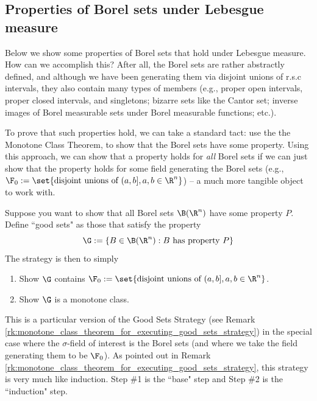 \documentclass{article} %
\begin{document}
\subsection{Properties of Borel sets under Lebesgue measure} \label{sec:properties_of_borel_sets}

Below we show some properties of Borel sets that hold under Lebesgue measure.  How can we accomplish this?  After all, the Borel sets are rather abstractly defined, and although we have been generating them via disjoint unions of r.s.c intervals, they also contain many types of members (e.g., proper open intervals, proper closed intervals, and singletons; bizarre sets like the Cantor set; inverse images of Borel measurable sets under Borel measurable functions; etc.).

To prove that such properties hold, we can take a standard tact: use the the Monotone Class Theorem,  to show that the Borel sets have some property.  Using this approach, we can show that a property holds for \textit{all} Borel sets if we can just show that the property holds for some field generating the Borel sets (e.g., $\F_0 := \set{\text{disjoint unions of } (a,b], a,b \in \R^n }$) -- a much more tangible object to work with.


\begin{remark}{}
Suppose you want to show that all Borel sets $\B(\R^n)$ have some property $P$.  Define ``good sets" as those that satisfy the property
\[ \G := \{ B \in \B(\R^n) : B \text{ has property } P \} \]
The strategy is then to simply
\begin{enumerate}
\item Show $\G$ contains $\F_0 := \set{\text{disjoint unions of } (a,b], a,b \in \R^n }$.
\item Show $\G$ is a monotone class.  
\end{enumerate}	 
\label{rk:monotone_class_theorem_for_executing_good_sets_strategy_with_borel_sets}
\end{remark}


This is a particular version of the Good Sets Strategy (see Remark \ref{rk:monotone_class_theorem_for_executing_good_sets_strategy}) in the special case where the $\sigma$-field of interest is the Borel sets (and where we take the field generating them to be $\F_0$).  As pointed out in Remark \ref{rk:monotone_class_theorem_for_executing_good_sets_strategy}, this strategy is very much like induction.  Step \#1 is the ``base" step and Step \#2 is the ``induction" step.
\end{document}
